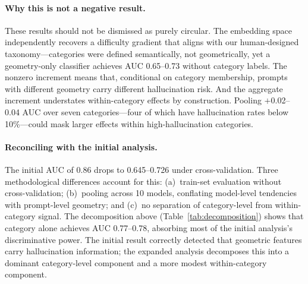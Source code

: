 \paragraph{Why this is not a negative result.} These results should not be dismissed as purely circular. The embedding space independently recovers a difficulty gradient that aligns with our human-designed taxonomy---categories were defined semantically, not geometrically, yet a geometry-only classifier achieves AUC 0.65--0.73 without category labels. The nonzero increment means that, conditional on category membership, prompts with different geometry carry different hallucination risk. And the aggregate increment understates within-category effects by construction. Pooling $+$0.02--0.04 AUC over seven categories---four of which have hallucination rates below 10\%---could mask larger effects within high-hallucination categories.

\paragraph{Reconciling with the initial analysis.} The initial AUC of 0.86 drops to 0.645--0.726 under cross-validation. Three methodological differences account for this: (a)~train-set evaluation without cross-validation; (b)~pooling across 10 models, conflating model-level tendencies with prompt-level geometry; and (c)~no separation of category-level from within-category signal. The decomposition above (Table~\ref{tab:decomposition}) shows that category alone achieves AUC 0.77--0.78, absorbing most of the initial analysis's discriminative power. The initial result correctly detected that geometric features carry hallucination information; the expanded analysis decomposes this into a dominant category-level component and a more modest within-category component.


